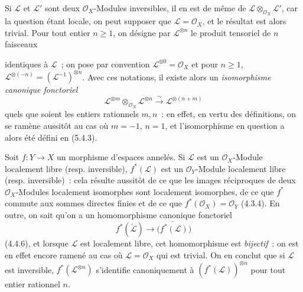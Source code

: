 \begin{env}[5.4.4]
\label{0.5.4.4-fr}
Si $\mathcal{L}$ et $\mathcal{L}'$ sont deux $\mathcal{O}_X$-Modules
inversibles, il en est de même de
$\mathcal{L}\otimes_{\mathcal{O}_X}\mathcal{L}'$, car la question étant
locale, on peut supposer que $\mathcal{L}=\mathcal{O}_X$, et le résultat est
alors trivial. Pour tout entier $n\geq1$, on désigne par
$\mathcal{L}^{\otimes n}$ le produit tensoriel de $n$ faisceaux


identiques à $\mathcal{L}$~; on pose par convention
$\mathcal{L}^{\otimes0}=\mathcal{O}_X$ et pour $n\geq1$,
$\mathcal{L}^{\otimes(-n)}=(\mathcal{L}^{-1})^{\otimes n}$. Avec ces
notations, il existe alors un \emph{isomorphisme canonique fonctoriel}
\[
  \mathcal{L}^{\otimes m}\otimes_{\mathcal{O}_X}\mathcal{L}^{\otimes n}
  \xrightarrow{\sim}
  \mathcal{L}^{\otimes(n+m)}
  \tag{5.4.4.1}\label{0.5.4.4.1-fr}
\]
quels que soient les entiers rationnels $m,n$~: en effet, en vertu des
définitions, on se ramène aussitôt au cas où $m=-1$, $n=1$, et
l'isomorphisme en question a alors été défini en (5.4.3).
\end{env}

\begin{env}[5.4.5]
Soit $f:Y\to X$ un morphisme d'espaces annelés. Si $\mathcal{L}$ est un
$\mathcal{O}_X$-Module localement libre (resp. inversible),
$f^*(\mathcal{L})$ est un $\mathcal{O}_Y$-Module localement libre (resp.
inversible)~: cela résulte aussitôt de ce que les images réciproques de deux
$\mathcal{O}_X$-Modules localement isomorphes sont localement isomorphes, de
ce que $f^*$ commute aux sommes directes finies et de ce que
$f^*(\mathcal{O}_X)=\mathcal{O}_Y$ (4.3.4). En outre, on sait qu'on a un
homomorphisme canonique fonctoriel
\[
  f^*(\check{\mathcal{L}})
  \longrightarrow
  \check{\bigl(f^*(\mathcal{L})\bigr)}
\]
(4.4.6), et lorsque $\mathcal{L}$ est localement libre, cet homomorphisme est
\emph{bijectif}~: on est en effet encore ramené au cas où
$\mathcal{L}=\mathcal{O}_X$ qui est trivial. On en conclut que si
$\mathcal{L}$ est inversible, $f^*(\mathcal{L}^{\otimes n})$ s'identifie
canoniquement à $(f^*(\mathcal{L}))^{\otimes n}$ pour tout entier rationnel
$n$.
\end{env}

